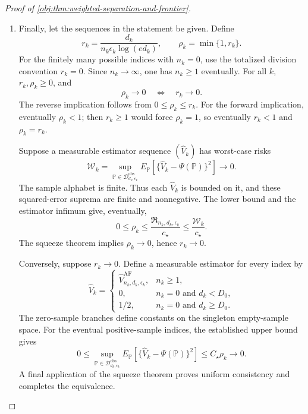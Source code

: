 \begin{proof}[Proof of \cref{obj:thm:weighted-separation-and-frontier}]
\begin{enumerate}
\item
Finally, let the sequences in the statement be given. Define
\[
r_k=\frac{d_k}{n_k\epsilon_k\log(ed_k)},
\qquad
\rho_k=\min\{1,r_k\}.
\]
For the finitely many possible indices with \(n_k=0\), use the totalized division convention \(r_k=0\). Since \(n_k\to\infty\), one has \(n_k\ge1\) eventually. For all \(k\), \(r_k,\rho_k\ge0\), and
\[
\rho_k\longrightarrow0
\quad\Longleftrightarrow\quad
r_k\longrightarrow0.
\]
The reverse implication follows from \(0\le\rho_k\le r_k\).
For the forward implication, eventually \(\rho_k<1\); then
\(r_k\ge1\) would force \(\rho_k=1\), so eventually
\(r_k<1\) and \(\rho_k=r_k\).

Suppose a measurable estimator sequence \((\widehat V_k)\) has worst-case risks
\[
\mathcal W_k
=
\sup_{\mathbb P\in\mathcal D_{d_k,\epsilon_k}^{\mathrm{obs}}}
E_{\mathbb P}
[\{\widehat V_k-\Psi(\mathbb P)\}^2]
\longrightarrow0.
\]
The sample alphabet is finite. Thus each \(\widehat V_k\) is bounded on it, and these squared-error suprema are finite and nonnegative. The lower bound and the estimator infimum give, eventually,
\[
0\le\rho_k
\le\frac{\mathfrak R_{n_k,d_k,\epsilon_k}}{c_\star}
\le\frac{\mathcal W_k}{c_\star}.
\]
The squeeze theorem implies \(\rho_k\to0\), hence \(r_k\to0\).

Conversely, suppose \(r_k\to0\). Define a measurable estimator for every index by
\[
\widehat V_k=
\begin{cases}
\widehat V_{n_k,d_k,\epsilon_k}^{\mathrm{AF}},&n_k\ge1,\\
0,&n_k=0\text{ and }d_k<D_0,\\
1/2,&n_k=0\text{ and }d_k\ge D_0.
\end{cases}
\]
The zero-sample branches define constants on the singleton empty-sample space. For the eventual positive-sample indices, the established upper bound gives
\[
0\le
\sup_{\mathbb P\in\mathcal D_{d_k,\epsilon_k}^{\mathrm{obs}}}
E_{\mathbb P}
[\{\widehat V_k-\Psi(\mathbb P)\}^2]
\le C_\star\rho_k\longrightarrow0.
\]
A final application of the squeeze theorem proves uniform consistency and completes the equivalence.
\end{enumerate}
\end{proof}
